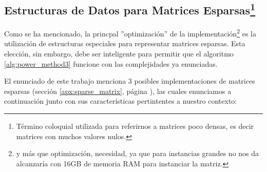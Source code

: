 \subsection{Estructuras de Datos para Matrices
Esparsas\protect\footnote{T\'ermino coloquial utilizada para referirnos a
matrices poco densas, es decir matrices con muchos valores nulos.}}
\par Como se ha mencionado, la princpal ''optimizaci\'on'' de la
implementaci\'on\footnote{y m\'as que optimizaci\'on, necesidad, ya que para
instancias grandes no nos da alcanzar\'ia con 16GB de memoria RAM para
instanciar la matriz.} es la utilizaci\'on de estructuras especiales para
representar matrices esparsas. Esta elecci\'on, sin embargo, debe ser
inteligente para permitir que el algoritmo \ref{alg:power_method3} funcione con
las complejidades ya enunciadas.

\par El enunciado de este trabajo menciona 3 posibles implementaciones de
matrices esparsas (secci\'on \ref{apx:sparse_matrix}, p\'agina
\pageref{apx:sparse_matrix}), las cuales enunciamos a continuaci\'on junto con
sus caracter\'isticas pertintentes a nuestro contexto:

